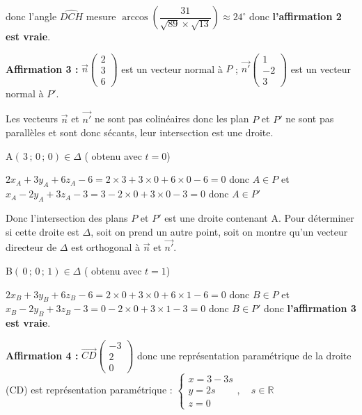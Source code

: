 \documentclass[10pt]{article}
\begin{document}
donc l'angle $\widehat{DCH}$ mesure $\arccos \left( \dfrac{31}{\sqrt{89} \times \sqrt{13}} \right)\approx 24^\circ$ donc \textbf{l'affirmation 2 est vraie}.
 
 

\textbf{Affirmation 3 :} $\overrightarrow{n} \begin{pmatrix}  2 \\  3  \\6 \end{pmatrix}$  est un vecteur normal à $P$ ; $\overrightarrow{n'} \begin{pmatrix}  1 \\  -2  \\3 \end{pmatrix}$  est un vecteur normal à $P'$.

Les vecteurs $\overrightarrow{n}$ et $\overrightarrow{n'}$ ne sont pas colinéaires donc les plan $P$ et $P'$ ne sont pas parallèles et sont donc sécants, leur intersection est une droite.

A$(\,3\,;\,0\,;\,0) \in \Delta$ ( obtenu avec $t=0$) 

$2x_A + 3y_A + 6z_A - 6 = 2 \times 3+3 \times0 + 6 \times 0 -6=  0 $ donc $A \in P$  et $x_A - 2y_A + 3z_A - 3 =3 - 2\times0 + 3\times0 - 3=0$ donc $A \in P'$

Donc l'intersection des plans \( P \) et \( P' \)  est une droite contenant A. Pour déterminer si cette droite est $\Delta$, soit on prend un autre point, soit on montre qu'un vecteur directeur de $\Delta$ est orthogonal à $\overrightarrow{n}$ et $\overrightarrow{n'}$.

B$(\,0\,;\,0\,;\,1) \in \Delta$ ( obtenu avec $t=1$) 

$2x_B + 3y_B + 6z_B - 6 = 2 \times 0+3 \times0 + 6 \times 1 -6=  0 $ donc $B \in P$  et $x_B - 2y_B + 3z_B - 3 =0 - 2\times0 + 3\times1 - 3=0$ donc $B\in P'$ 
donc \textbf{l'affirmation 3 est vraie}.

 

\textbf{Affirmation 4 :} $\overrightarrow{CD} \begin{pmatrix} -3 \\2\\0 \end{pmatrix}$ donc une représentation paramétrique de la droite (CD) est représentation paramétrique : $ \left\{
    \begin{array}{l}
    x = 3-3s\\
    y = 2s \\
    z = 0
    \end{array},\quad s \in \mathbb{R}
    \right.$
\end{document}
